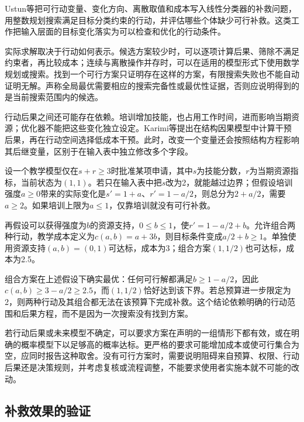 Ustun等把可行动变量、变化方向、离散取值和成本写入线性分类器的补救问题，用整数规划搜索满足目标分类约束的行动，并评估哪些个体缺少可行补救。这类工作把输入层面的目标变化落实为可以检查和优化的行动条件。

实际求解取决于行动如何表示。候选方案较少时，可以逐项计算后果、筛除不满足约束者，再比较成本；连续与离散操作并存时，可以在适用的模型形式下使用数学规划或搜索。找到一个可行方案只证明存在这样的方案，有限搜索失败也不能自动证明无解。声称全局最优需要相应的搜索完备性或最优性证据，否则应说明得到的是当前搜索范围内的候选。

行动后果之间还可能存在依赖。培训增加技能，也占用工作时间，进而影响当期资源；优化器不能把这些变化独立设定。Karimi等提出在结构因果模型中计算干预后果，再在行动空间选择低成本干预。此时，改变一个变量还会按照结构方程影响其后继变量，区别于在输入表中独立修改多个字段。

\begin{example}[约束与成本决定补救方案]
\label{ex:interpretability-causal-recourse}
设一个教学模型仅在$s+r\geq3$时批准某项申请，其中$s$为技能分数，$r$为当期资源指标，当前状态为$(1,1)$。若只在输入表中把$s$改为2，就能越过边界；但假设培训强度$a\geq0$带来的实际变化是$s'=1+a$、$r'=1-a/2$，则总分为$2+a/2$，需要$a\geq2$。如果培训上限为$a\leq1$，仅靠培训就没有可行补救。

再假设可以获得强度为$b$的资源支持，$0\leq b\leq1$，使$r'=1-a/2+b$。允许组合两种行动，教学成本定义为$c(a,b)=a+3b$，则目标条件变成$a/2+b\geq1$。单独使用资源支持$(a,b)=(0,1)$可达标，成本为3；组合方案$(1,1/2)$也可达标，成本为2.5。

组合方案在上述假设下确实最优：任何可行解都满足$b\geq1-a/2$，因此$c(a,b)\geq3-a/2\geq2.5$，而$(1,1/2)$恰好达到该下界。若总预算进一步限定为2，则两种行动及其组合都无法在该预算下完成补救。这个结论依赖明确的行动范围和后果方程，而不是因为一次搜索没有找到方案。
\end{example}

若行动后果或未来模型不确定，可以要求方案在声明的一组情形下都有效，或在明确的概率模型下以足够高的概率达标。更严格的要求可能增加成本或使可行集合为空，应同时报告这种取舍。没有可行方案时，需要说明阻碍来自预算、权限、行动后果还是决策规则，并考虑复核或流程调整，不能要求使用者实施本就不可能的改动。

\subsection{补救效果的验证}
\label{sec:interpretability-recourse-validation}

